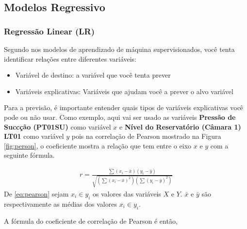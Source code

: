 \subsection{Modelos Regressivo}\label{subsec:reg}

\subsubsection{Regress\~ao Linear (LR)}

Segundo  nos modelos de aprendizado de máquina supervisionados, você tenta identificar relações entre diferentes variáveis:

\begin{itemize}
	\item Variável de destino: a variável que você tenta prever
	\item Variáveis explicativas: Variáveis que ajudam você a prever o alvo variável
\end{itemize}

Para a previsão, é importante entender quais tipos de variáveis explicativas você pode ou não usar. Como exemplo, aqui vai ser usado as variáveis \textbf{Pressão de Succção (PT01SU)} como variável $x$ e \textbf{Nível do Reservatório (Câmara 1) LT01} como variável $y$ pois na correlação de Pearson mostrado na Figura \ref{fig:person}, o coeficiente mostra a relação que tem entre o eixo $x$ e $y$ com a seguinte fórmula.



\begin{eqnarray}
	r=\frac{\sum\left(x_i-\bar{x}\right)\left(y_i-\bar{y}\right)}{\sqrt{\left(\sum\left(x_i-\bar{x}\right)^2\right)\left(\sum\left(y_i-\bar{y}\right)^2\right)}}\label{eq:pearson}
\end{eqnarray}
De \eqref{eq:pearson} sejam $x_i \in y_i$ os valores das variáveis $X$ e $Y$.  $\bar{x}$ e $\bar{y}$ são respectivamente as médias dos valores $x_i \in y_i$.

A fórmula do coeficiente de correlação de Pearson é então,

